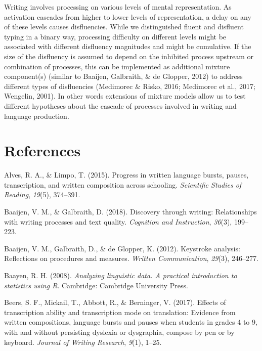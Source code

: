 \documentclass[english,man,floatsintext]{apa7}
\begin{document}
Writing involves processing on various levels of mental representation. As activation cascades from higher to lower levels of representation, a delay on any of these levels causes disfluencies. While we distinguished fluent and disfluent typing in a binary way, processing difficulty on different levels might be associated with different disfluency magnitudes and might be cumulative. If the size of the disfluency is assumed to depend on the inhibited process upstream or combination of processes, this can be implemented as additional mixture component(s) (similar to Baaijen, Galbraith, \& de Glopper, 2012) to address different types of disfluencies (Medimorec \& Risko, 2016; Medimorec et al., 2017; Wengelin, 2001). In other words extensions of mixture models allow us to test different hypotheses about the cascade of processes involved in writing and language production.

\hypertarget{references}{%
\section{References}\label{references}}

\begingroup
\setlength{\parindent}{-0.5in}
\setlength{\leftskip}{0.5in}

\hypertarget{ref}{}

\endgroup

\hypertarget{refs}{}
\leavevmode\hypertarget{ref-alves2015progress}{}%
Alves, R. A., \& Limpo, T. (2015). Progress in written language bursts, pauses, transcription, and written composition across schooling. \emph{Scientific Studies of Reading}, \emph{19}(5), 374--391.

\leavevmode\hypertarget{ref-baaijen2018discovery}{}%
Baaijen, V. M., \& Galbraith, D. (2018). Discovery through writing: Relationships with writing processes and text quality. \emph{Cognition and Instruction}, \emph{36}(3), 199--223.

\leavevmode\hypertarget{ref-baaijen2012keystroke}{}%
Baaijen, V. M., Galbraith, D., \& de Glopper, K. (2012). Keystroke analysis: Reflections on procedures and measures. \emph{Written Communication}, \emph{29}(3), 246--277.

\leavevmode\hypertarget{ref-baa08book}{}%
Baayen, R. H. (2008). \emph{Analyzing linguistic data. A practical introduction to statistics using R}. Cambridge: Cambridge University Press.

\leavevmode\hypertarget{ref-beers2017effects}{}%
Beers, S. F., Mickail, T., Abbott, R., \& Berninger, V. (2017). Effects of transcription ability and transcription mode on translation: Evidence from written compositions, language bursts and pauses when students in grades 4 to 9, with and without persisting dyslexia or dysgraphia, compose by pen or by keyboard. \emph{Journal of Writing Research}, \emph{9}(1), 1--25.
\end{document}
